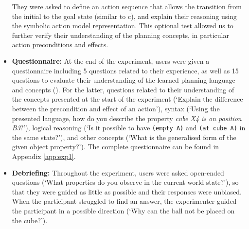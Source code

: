 \begin{itemize}
{They were asked to define an action sequence that allows the transition from the initial to the goal state (similar to c), and explain their reasoning using the symbolic action model representation.
This optional test allowed us to further verify their understanding of the planning concepts, in particular action preconditions and effects.}
  \item{\textbf{Questionnaire:} At the end of the experiment, users were given a questionnaire including 5 questions related to their experience, as well as 15 questions to evaluate their understanding of the learned planning language and concepts ().
  For the latter, questions related to their understanding of the concepts presented at the start of the experiment (\eg `Explain the difference between the precondition and effect of an action'), syntax (\eg `Using the presented language, how do you describe the property \textit{cube X4 is on position B3}?'),
  logical reasoning 
  	(\eg `Is it possible to have \texttt{(empty A)} and \texttt{(at cube A)} in the same state?'), and other concepts (\eg `What is the generalised form of the given object property?').
  The complete questionnaire can be found in Appendix \ref{app:exp1}.}
   \item {\begin{sloppypar}
   	\textbf{Debriefing:} Throughout the experiment, users were asked open-ended questions (\eg `What properties do you observe in the current world state?'), so that they were guided as little as possible and their responses were unbiased.
When the participant struggled to find an answer, the experimenter guided the participant in a possible direction (\eg `Why can the ball not be placed on the cube?').
\end{sloppypar}
} 
\end{itemize}


